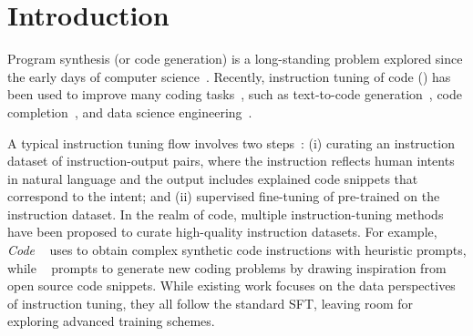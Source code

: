 \section{Introduction}
Program synthesis (or code generation) is a long-standing problem explored since the early days of computer science~\cite{manna1971toward}. 
Recently, instruction tuning of code  () has been used to improve many coding tasks~\cite{codealpaca, luo2023wizardcoder, wei2023magicoder}, such as text-to-code generation~\cite{chen2021evaluating, austin2021program}, code completion~\cite{cassano2022multiple}, and data science engineering~\cite{lai2022ds1000}. 


A typical instruction tuning flow involves two steps~\cite{zhang2023instruction}: 
(i) curating an instruction dataset of instruction-output pairs, where the instruction reflects human intents in natural language and the output includes explained code snippets that correspond to the intent; 
and 
(ii) supervised fine-tuning of pre-trained \llm on the instruction dataset. 
In the realm of code, multiple instruction-tuning methods have been proposed to curate high-quality instruction datasets.
For example, \textit{Code \evolinstruct}~\cite{luo2023wizardcoder} uses \chatgpt to obtain complex synthetic code instructions with heuristic prompts, while \ossinstruct~\cite{wei2023magicoder} prompts \chatgpt to generate new coding problems by drawing inspiration from open source code snippets.
While existing work focuses on the data perspectives of instruction tuning, 
they all follow the standard SFT, leaving room for exploring advanced training schemes.




